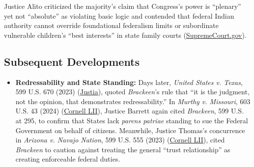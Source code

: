 \documentclass[12pt]{article}
\begin{document}
Justice Alito criticized the majority's claim that Congress's power is ``plenary'' yet not ``absolute'' as violating basic logic and contended that federal Indian authority cannot override foundational federalism limits or subordinate vulnerable children's ``best interests'' in state family courts (\href{https://www.supremecourt.gov/opinions/22pdf/21-376_7l48.pdf}{SupremeCourt.gov}).

\subsection{Subsequent Developments}

\begin{itemize}

\item \textbf{Redressability and State Standing:} Days later, \textit{United States v. Texas}, 599 U.S. 670 (2023) (\href{https://supreme.justia.com/cases/federal/us/599/22-58/}{Justia}), quoted \textit{Brackeen}'s rule that ``it is the judgment, not the opinion, that demonstrates redressability.'' In \textit{Murthy v. Missouri}, 603 U.S. 43 (2024) (\href{https://www.law.cornell.edu/supremecourt/text/23-411}{Cornell LII}), Justice Barrett again cited \textit{Brackeen}, 599 U.S. at 295, to confirm that States lack \textit{parens patriae} standing to sue the Federal Government on behalf of citizens. Meanwhile, Justice Thomas's concurrence in \textit{Arizona v. Navajo Nation}, 599 U.S. 555 (2023) (\href{https://www.law.cornell.edu/supremecourt/text/21-1484}{Cornell LII}), cited \textit{Brackeen} to caution against treating the general ``trust relationship'' as creating enforceable federal duties.

\end{itemize}
\end{document}
